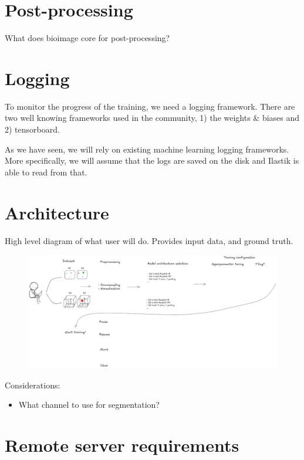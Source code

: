\documentclass[12pt, a4paper]{article}
\begin{document}
\section{Post-processing}

What does bioimage core for post-processing?


\section{Logging}

To monitor the progress of the training, we need a logging framework. There are two well knowing frameworks used in the community, 1) the weights \& biases and 2) tensorboard.


As we have seen, we will rely on existing machine learning logging frameworks. More specifically, we will assume that the logs are saved on the disk and Ilastik is able to read from that.


\section{Architecture}

High level diagram of what user will do. Provides input data, and ground truth.

\begin{figure}[h!]
    \centering
    \includegraphics[width=\textwidth]{architecture.png}
\end{figure}

Considerations:
\begin{itemize}
    \item What channel to use for segmentation?
\end{itemize}

\section{Remote server requirements}
\end{document}
